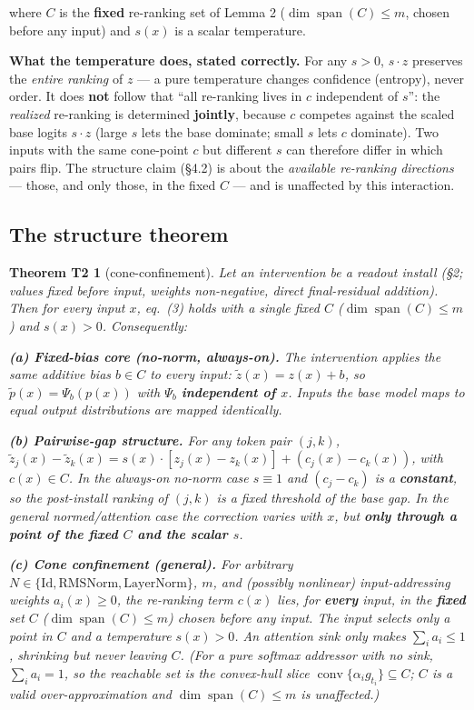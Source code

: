\documentclass[11pt]{article}
\theoremstyle{plain}
\newtheorem*{thmTtwo}{Theorem T2}
\theoremstyle{definition}
\begin{document}
where $C$ is the \textbf{fixed} re-ranking set of Lemma 2 ($\dim\operatorname{span}(C) \le m$, chosen before any input) and $s(x)$ is a scalar temperature.

\textbf{What the temperature does, stated correctly.} For any $s > 0$, $s\cdot z$ preserves the \emph{entire ranking} of $z$ --- a pure temperature changes confidence (entropy), never order. It does \textbf{not} follow that ``all re-ranking lives in $c$ independent of $s$'': the \emph{realized} re-ranking is determined \textbf{jointly}, because $c$ competes against the scaled base logits $s\cdot z$ (large $s$ lets the base dominate; small $s$ lets $c$ dominate). Two inputs with the same cone-point $c$ but different $s$ can therefore differ in which pairs flip. The structure claim (\S4.2) is about the \emph{available re-ranking directions} --- those, and only those, in the fixed $C$ --- and is unaffected by this interaction.

\subsection{The structure theorem}

\begin{thmTtwo}[cone-confinement]
Let an intervention be a readout install (\S2; values fixed before input, weights non-negative, direct final-residual addition). Then for every input $x$, eq.~(3) holds with a \emph{single} fixed $C$ ($\dim\operatorname{span}(C) \le m$) and $s(x) > 0$. Consequently:

\textbf{(a) Fixed-bias core (no-norm, always-on).} The intervention applies the \emph{same} additive bias $b \in C$ to every input: $\tilde z(x) = z(x) + b$, so $\tilde p(x) = \Psi_b(p(x))$ with $\Psi_b$ \textbf{independent of $x$}. Inputs the base model maps to equal output distributions are mapped identically.

\textbf{(b) Pairwise-gap structure.} For any token pair $(j,k)$, $\tilde z_j(x) - \tilde z_k(x) = s(x)\cdot[z_j(x) - z_k(x)] + (c_j(x) - c_k(x))$, with $c(x) \in C$. In the always-on no-norm case $s \equiv 1$ and $(c_j - c_k)$ is a \textbf{constant}, so the post-install ranking of $(j,k)$ is a fixed threshold of the \emph{base} gap. In the general normed/attention case the correction varies with $x$, but \textbf{only through a point of the fixed $C$ and the scalar $s$}.

\textbf{(c) Cone confinement (general).} For arbitrary $N \in \{\mathrm{Id}, \mathrm{RMSNorm}, \mathrm{LayerNorm}\}$, $m$, and (possibly nonlinear) input-addressing weights $a_i(x) \ge 0$, the re-ranking term $c(x)$ lies, for \textbf{every} input, in the \textbf{fixed} set $C$ ($\dim\operatorname{span}(C) \le m$) chosen before any input. The input selects only a \emph{point} in $C$ and a temperature $s(x) > 0$. An attention sink only makes $\sum_i a_i \le 1$, shrinking but never leaving $C$. (For a pure softmax addressor with no sink, $\sum_i a_i = 1$, so the reachable set is the convex-hull slice $\operatorname{conv}\{\alpha_i g_{t_i}\} \subseteq C$; $C$ is a valid over-approximation and $\dim\operatorname{span}(C) \le m$ is unaffected.)
\end{thmTtwo}
\end{document}
